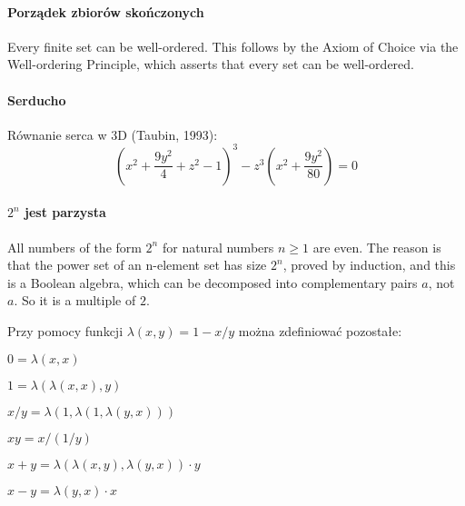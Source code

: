 \begin{parnumbers}
\paragraph{Porządek zbiorów skończonych} Every finite set can be well-ordered. This follows by the Axiom of Choice via the Well-ordering Principle, which asserts that every set can be well-ordered.

\paragraph{Serducho}
Równanie serca w 3D (Taubin, 1993): $$\left(x^2+\frac{9y^2}{4}+z^2-1\right)^3-z^3\left(x^2+\frac{9y^2}{80}\right) = 0$$





\paragraph{$2^n$ jest parzysta} All numbers of the form $2^n$ for natural numbers $n \geq 1$ are even. The reason is that the power set of an n-element set has size $2^n$, proved by induction, and this is a Boolean algebra, which can be decomposed into complementary pairs $a$, not $a$. So it is a multiple of $2$.













\begin{fkt}Przy pomocy funkcji $\lambda(x,y) = 1-x/y$ można zdefiniować pozostałe:
\begin{itemx}
\item $0  =  \lambda(x,x)$
\item $1 = \lambda(\lambda(x,x),y) $
\item $x/y =  \lambda(1,\lambda(1,\lambda(y,x)))$
\item $xy = x/(1/y) $
\item $x+y = \lambda(\lambda(x,y),\lambda(y,x)) \cdot y $
\item $x-y = \lambda (y,x) \cdot x $
\end{itemx}
\end{fkt}





\begin{fkt}
\end{fkt}


\end{parnumbers}
